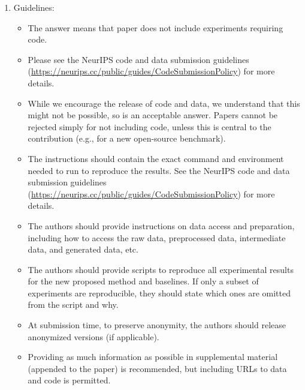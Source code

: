\begin{enumerate}
    \item[] Guidelines:
    \begin{itemize}
        \item The answer \answerNA{} means that paper does not include experiments requiring code.
        \item Please see the NeurIPS code and data submission guidelines (\url{https://neurips.cc/public/guides/CodeSubmissionPolicy}) for more details.
        \item While we encourage the release of code and data, we understand that this might not be possible, so \answerNo{} is an acceptable answer. Papers cannot be rejected simply for not including code, unless this is central to the contribution (e.g., for a new open-source benchmark).
        \item The instructions should contain the exact command and environment needed to run to reproduce the results. See the NeurIPS code and data submission guidelines (\url{https://neurips.cc/public/guides/CodeSubmissionPolicy}) for more details.
        \item The authors should provide instructions on data access and preparation, including how to access the raw data, preprocessed data, intermediate data, and generated data, etc.
        \item The authors should provide scripts to reproduce all experimental results for the new proposed method and baselines. If only a subset of experiments are reproducible, they should state which ones are omitted from the script and why.
        \item At submission time, to preserve anonymity, the authors should release anonymized versions (if applicable).
        \item Providing as much information as possible in supplemental material (appended to the paper) is recommended, but including URLs to data and code is permitted.
    \end{itemize}



\end{enumerate}
